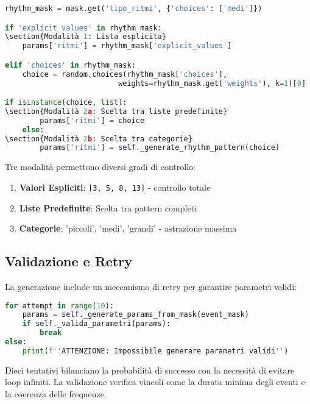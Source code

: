 \begin{lstlisting}[language=Python]
rhythm_mask = mask.get('tipo_ritmi', {'choices': ['medi']})

if 'explicit_values' in rhythm_mask:
\section{Modalità 1: Lista esplicita}
    params['ritmi'] = rhythm_mask['explicit_values']

elif 'choices' in rhythm_mask:
    choice = random.choices(rhythm_mask['choices'], 
                          weights=rhythm_mask.get('weights'), k=1)[0]

if isinstance(choice, list):
\section{Modalità 2a: Scelta tra liste predefinite}
        params['ritmi'] = choice
    else:
\section{Modalità 2b: Scelta tra categorie}
        params['ritmi'] = self._generate_rhythm_pattern(choice)
\end{lstlisting}

Tre modalità permettono diversi gradi di controllo:
\begin{enumerate}
    \item \textbf{Valori Espliciti}: \texttt{[3, 5, 8, 13]} - controllo totale
    \item \textbf{Liste Predefinite}: Scelta tra pattern completi
    \item \textbf{Categorie}: 'piccoli', 'medi', 'grandi' - astrazione massima
\end{enumerate}
\subsection{Validazione e Retry}
La generazione include un meccanismo di retry per garantire parametri validi:

\begin{lstlisting}[language=Python]
for attempt in range(10):
    params = self._generate_params_from_mask(event_mask)
    if self._valida_parametri(params):
        break
else:
    print(f''ATTENZIONE: Impossibile generare parametri validi'')
\end{lstlisting}

Dieci tentativi bilanciano la probabilità di successo con la necessità di evitare loop infiniti. La validazione verifica vincoli come la durata minima degli eventi e la coerenza delle frequenze.

